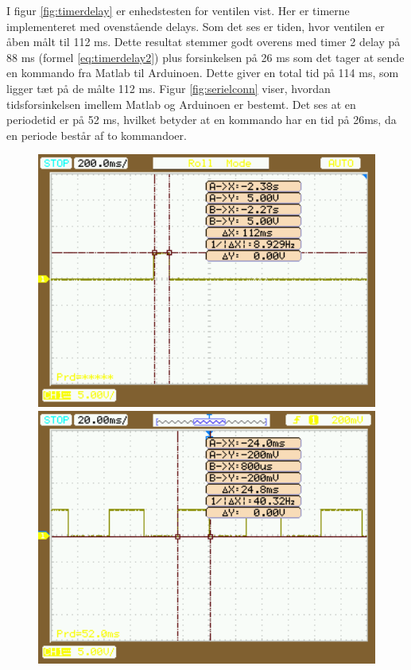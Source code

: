 I figur \ref{fig:timerdelay} er enhedstesten for ventilen vist. Her er timerne implementeret med ovenstående delays. Som det ses er tiden, hvor ventilen er åben målt til 112 ms. Dette resultat stemmer godt overens med timer 2 delay på 88 ms (formel \ref{eq:timerdelay2}) plus forsinkelsen på 26 ms som det tager at sende en kommando fra Matlab til Arduinoen. Dette giver en total tid på 114 ms, som ligger tæt på de målte 112 ms. Figur \ref{fig:serielconn} viser, hvordan tidsforsinkelsen imellem Matlab og Arduinoen er bestemt. Det ses at en periodetid er på 52 ms, hvilket betyder at en kommando har en tid på 26ms, da en periode består af to kommandoer.

 \begin{figure}[H] \centering
\begin{minipage}[b]{0.48\textwidth} \centering
\includegraphics[width=1.00\textwidth]{billeder/timerdelay.png} %
\end{minipage} \hfill
\begin{minipage}[b]{0.48\textwidth} \centering
\includegraphics[width=1.00\textwidth]{billeder/serialconn.png} %

\end{minipage}
\end{figure}
